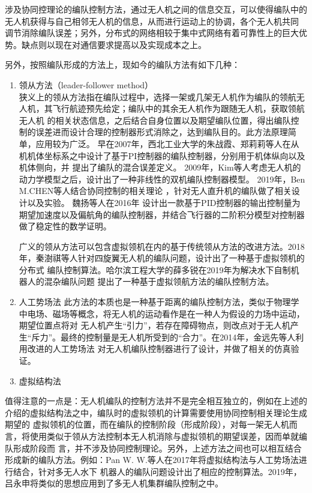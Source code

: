 涉及协同控理论的编队控制方法，通过无人机之间的信息交互，可以使得编队中的无人机获得与自己相邻无人机的信息，从而进行运动上的协调，各个无人机共同
调节消除编队误差；另外，分布式的网络相较于集中式网络有着可靠性上的巨大优势。缺点则以现在对通信要求提高以及实现成本之上。

另外，按照编队形成的方法上，现如今的编队方法有如下几种：
\begin{enumerate}
    \item 领从方法（leader-follower method）\\
        狭义上的领从方法指在编队过程中，选择一架或几架无人机作为编队的领航无人机，其飞行航迹预先给定；编队中的其余无人机作为跟随无人机，获取领航无人机
        的相关状态信息，之后结合自身位置以及期望编队位置，得出编队控制的误差进而设计合理的控制器形式消除之，达到编队目的。此方法原理简单，应用较为广泛。
        早在2007年，西北工业大学的朱战霞、郑莉莉等人在从机机体坐标系之中设计了基于PI控制器的编队控制器，分别用于机体纵向以及机体侧向，并
        提出了编队的混合误差定义。\cite{ZhuZhanXia2007}
        2009年，Kim等人考虑无人机的动力学模型之后，设计出了一种非线性的双机编队控制器模型。\cite{Kim2009A} 2019年，Ben M.CHEN等人结合协同控制的相关理论
        ，针对无人直升机的编队做了相关设计以及实验。\cite{Ben2010Design}
        魏扬等人在2016年
        设计出一款基于PID控制器的输出控制量为期望加速度以及偏航角的编队控制器，并结合飞行器的二阶积分模型对控制器做了稳定性的数学证明。\cite{WeiYang2016}

        广义的领从方法可以包含虚拟领机在内的基于传统领从方法的改进方法。2018年，秦澍祺等人针对四旋翼无人机的编队问题，设计出了一种基于虚拟领机的分布式
        编队控制算法。\cite{Qin2018}哈尔滨工程大学的薛多锐在2019年为解决水下自制机器人的混杂编队问题
        提出了一种基于虚拟领航方法的编队控制方法。
    \item 人工势场法
        此方法的本质也是一种基于距离的编队控制方法，类似于物理学中电场、磁场等概念，将无人机的运动看作是在一种人为假设的力场中运动，期望位置点将对
        无人机产生“引力”，若存在障碍物点，则改点对于无人机产生“斥力”。最终的控制量是无人机所受到的“合力”。在2014年，金远先等人利用改进的人工势场法
        对无人机编队控制器进行了设计，并做了相关的仿真验证。\cite{Jin2014}
    \item 虚拟结构法

\end{enumerate}
值得注意的一点是：无人机编队的控制方法并不是完全相互独立的，例如在上述的介绍的虚拟结构法之中，编队时的虚拟领机的计算需要使用协同控制相关理论生成期望的
虚拟领机的位置，而在编队的控制阶段（形成阶段），对每一架无人机而言，将使用类似于领从方法控制本无人机消除与虚拟领机的期望误差，因而单就编队形成阶段而
言，并不涉及协同控制理论。另外，上述方法之间也可以相互结合形成新的编队方法。例如：Pan W. W.等人在2017年将虚拟结构法与人工势场法进行结合，针对多无人水下
机器人的编队问题设计出了相应的控制算法。\cite{Pan2017A}2019年，吕永申将类似的思想应用到了多无人机集群编队控制之中。\cite{Lv2019}



